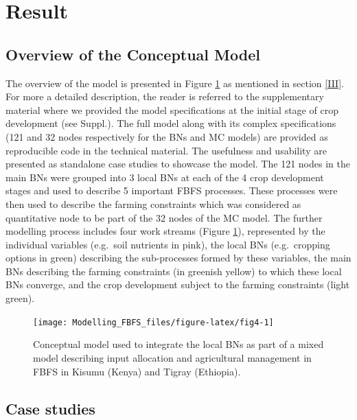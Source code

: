 \documentclass[12pt,oneside]{article}
\begin{document}
\hypertarget{IV}{%
\section{Result}\label{IV}}

\hypertarget{IV1}{%
\subsection{Overview of the Conceptual Model}\label{IV1}}

The overview of the model is presented in Figure \ref{fig:fig4} as mentioned in section \ref{III}. For more a detailed description, the reader is referred to the supplementary material where we provided the model specifications at the initial stage of crop development (see Suppl.). The full model along with its complex specifications (121 and 32 nodes respectively for the BNs and MC models) are provided as reproducible code in the technical material. The usefulness and usability are presented as standalone case studies to showcase the model. The 121 nodes in the main BNs were grouped into 3 local BNs at each of the 4 crop development stages and used to describe 5 important FBFS processes. These processes were then used to describe the farming constraints which was considered as quantitative node to be part of the 32 nodes of the MC model. The further modelling process includes four work streams (Figure \ref{fig:fig4}), represented by the individual variables (e.g.~soil nutrients in pink), the local BNs (e.g.~cropping options in green) describing the sub-processes formed by these variables, the main BNs describing the farming constraints (in greenish yellow) to which these local BNs converge, and the crop development subject to the farming constraints (light green).

\begin{figure}[!htbp]

{\centering \texttt{[image: Modelling\_FBFS\_files/figure-latex/fig4-1]} 

}

\caption{Conceptual model used to integrate the local BNs as part of a mixed model describing input allocation and agricultural management in FBFS in Kisumu (Kenya) and Tigray (Ethiopia).}\label{fig:fig4}
\end{figure}

\hypertarget{IV2}{%
\subsection{Case studies}\label{IV2}}
\end{document}
